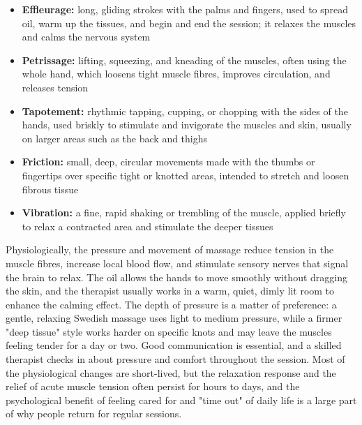 \begin{itemize}
    \item \textbf{Effleurage:} long, gliding strokes with the palms and fingers, used to spread oil, warm up the tissues, and begin and end the session; it relaxes the muscles and calms the nervous system
    \item \textbf{Petrissage:} lifting, squeezing, and kneading of the muscles, often using the whole hand, which loosens tight muscle fibres, improves circulation, and releases tension
    \item \textbf{Tapotement:} rhythmic tapping, cupping, or chopping with the sides of the hands, used briskly to stimulate and invigorate the muscles and skin, usually on larger areas such as the back and thighs
    \item \textbf{Friction:} small, deep, circular movements made with the thumbs or fingertips over specific tight or knotted areas, intended to stretch and loosen fibrous tissue
    \item \textbf{Vibration:} a fine, rapid shaking or trembling of the muscle, applied briefly to relax a contracted area and stimulate the deeper tissues
\end{itemize}

Physiologically, the pressure and movement of massage reduce tension in the muscle fibres, increase local blood flow, and stimulate sensory nerves that signal the brain to relax. The oil allows the hands to move smoothly without dragging the skin, and the therapist usually works in a warm, quiet, dimly lit room to enhance the calming effect. The depth of pressure is a matter of preference: a gentle, relaxing Swedish massage uses light to medium pressure, while a firmer "deep tissue" style works harder on specific knots and may leave the muscles feeling tender for a day or two. Good communication is essential, and a skilled therapist checks in about pressure and comfort throughout the session. Most of the physiological changes are short-lived, but the relaxation response and the relief of acute muscle tension often persist for hours to days, and the psychological benefit of feeling cared for and "time out" of daily life is a large part of why people return for regular sessions.

